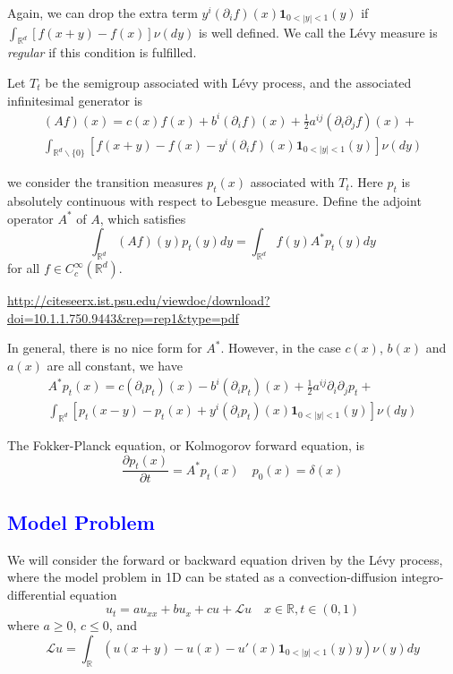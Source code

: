 \documentclass[10pt,a4paper]{article}
\newcommand{\RR}[0]{\mathbb{R}}
\newcommand{\lib}[1]{\textcolor{blue}{\section{#1}}}
\theoremstyle{definition}
\begin{document}
Again, we can drop the extra term $y^i(\partial_i f)(x) \mathbf{1}_{0<|y|<1}(y)$ if $\int_{\RR^d} [f(x+y)-f(x)]\nu(dy)$ is well defined. We call the L\'evy measure is \textit{regular} if this condition is fulfilled.


Let $T_t$ be the semigroup associated with L\'evy process, and the associated infinitesimal generator is
\begin{multline}\label{equ:Af2}
	(Af)(x) =  c(x) f(x) + b^i(\partial_i f)(x) + \frac{1}{2}a^{ij}(\partial_i \partial_j f)(x) +\\
	\int_{\RR^d\backslash\{0\}} [f(x+y)-f(x)-y^i(\partial_i f)(x) \mathbf{1}_{0<|y|<1}(y)]\nu(dy)
\end{multline}

 we consider the transition measures $p_t(x)$ associated with $T_t$. Here $p_t$ is absolutely continuous with respect to Lebesgue measure. Define the adjoint operator $A^*$ of $A$, which satisfies
 \begin{equation}
 	\int_{\RR^d} (Af)(y) p_t(y)dy=\int_{\RR^d} f(y)A^*p_t(y)dy
 \end{equation}
 for all $f\in C_c^\infty(\RR^d)$.
 
\url{http://citeseerx.ist.psu.edu/viewdoc/download?doi=10.1.1.750.9443&rep=rep1&type=pdf}


 In general, there is no nice form for $A^*$. However, in the case $c(x)$, $b(x)$ and $a(x)$ are all constant, we have
 \begin{multline}
 	A^*p_t(x) = c (\partial_i p_t)(x) - b^i (\partial_i p_t)(x) + \frac{1}{2}a^{ij}\partial_i\partial_j p_t +\\
 	\int_{\RR^d}\left[ p_t( x-y) -p_t(x)+y^i(\partial_i p_t)(x) \mathbf{1}_{0<|y|<1}(y) \right]\nu(dy)
 \end{multline}
 
 The Fokker-Planck equation, or Kolmogorov forward equation, is
 \begin{equation}
 	\frac{\partial p_t(x)}{\partial t} = A^*p_t(x)\quad p_0(x) = \delta(x)
 \end{equation}
 
\lib{Model Problem} 
 
 We will consider the forward or backward equation driven by the L\'evy process, where the model problem in 1D can be stated as a convection-diffusion integro-differential equation
\begin{equation}\label{equ:ut}
	u_t = a u_{xx} + bu_x + cu + \mathcal{L}u\quad x\in \RR, t\in (0,1)
\end{equation}
where $a\geq 0$, $c\leq 0$, and
\begin{equation}
	\mathcal{L}u = \int_\RR (u(x+y)-u(x)-u'(x)\mathbf{1}_{0<|y|<1}(y)y)\nu(y)dy
\end{equation}  
\end{document}
